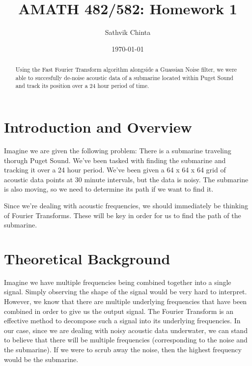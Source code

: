 \documentclass[11pt]{amsart}
\title{AMATH 482/582: Homework 1}
\author{Sathvik Chinta} %
\date{\today} %
\begin{document}
\maketitle 

\begin{abstract}
    Using the Fast Fourier Transform algorithm alongside a Guassian Noise filter, we were able to succesfully
    de-noise acoustic data of a submarine located within Puget Sound and track its position over a 24 hour
    period of time. 
\end{abstract}


\section{Introduction and Overview}\label{sec:Introduction}
Imagine we are given the following problem:
There is a submarine traveling thorugh Puget Sound. We've been tasked with finding the submarine
and tracking it over a 24 hour period. We've been given a 64 x 64 x 64 grid of acoustic data points at 
30 minute intervals, but the data is noisy. The submarine is also moving, so we need to determine 
its path if we want to find it. 

Since we're dealing with acoustic frequencies, we should immediately be thinking of Fourier Transforms.
These will be key in order for us to find the path of the submarine. 



\section{Theoretical Background}\label{sec:theory}
Imagine we have multiple frequencies being combined together into a single signal. Simply observing the shape of the 
signal would be very hard to interpret. However, we know that there are multiple underlying frequencies that have
been combined in order to give us the output signal. The Fourier Transform is an effective method to decompose 
such a signal into its underlying frequencies. In our case, since we are dealing with noisy acoustic data underwater, 
we can stand to believe that there will be multiple frequencies (corresponding to the noise and the submarine). If
we were to scrub away the noise, then the highest frequency would be the submarine.
\end{document}

